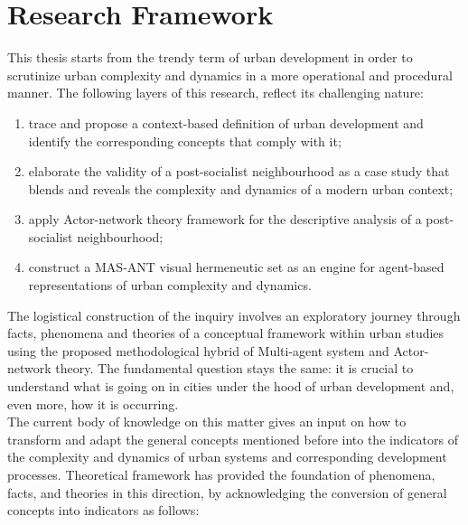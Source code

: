 \documentclass[11pt]{report}
\begin{document}
\section{Research Framework}

This thesis starts from the trendy term of urban development in order to scrutinize urban complexity and dynamics in a more operational and procedural manner. The following layers of this research, reflect its challenging nature:

\begin{enumerate}
\item trace and propose a context-based definition of urban development and identify the corresponding concepts that comply with it;
\item elaborate the validity of a post-socialist neighbourhood as a case study that blends and reveals the complexity and dynamics of a modern urban context;
\item apply Actor-network theory framework for the descriptive analysis of a post-socialist neighbourhood;
\item construct a MAS-ANT visual hermeneutic set as an engine for agent-based representations of urban complexity and dynamics.    
\end{enumerate}

The logistical construction of the inquiry involves an exploratory journey through facts, phenomena and theories of a conceptual framework within urban studies using the proposed methodological hybrid of Multi-agent system and Actor-network theory. The fundamental question stays the same: it is crucial to understand what is going on in cities under the hood of urban development and, even more, how it is occurring.
\\
The current body of knowledge on this matter gives an input on how to transform and adapt the general concepts mentioned before into the indicators of the complexity and dynamics of urban systems and corresponding development processes. Theoretical framework has provided the foundation of phenomena, facts, and theories in this direction, by acknowledging the conversion of general concepts into indicators as follows:
\end{document}
